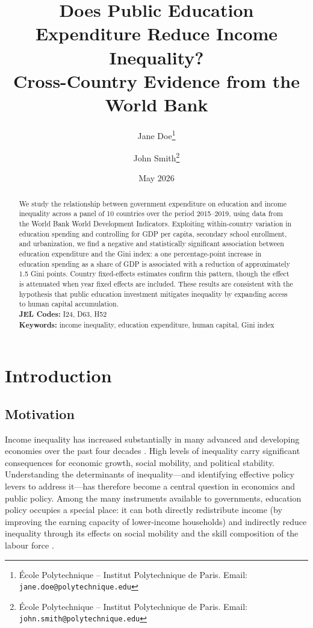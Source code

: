 \documentclass[12pt,a4paper]{article}
\title{\textbf{Does Public Education Expenditure Reduce Income Inequality?\\
Cross-Country Evidence from the World Bank}}
\author{
  Jane Doe\thanks{École Polytechnique -- Institut Polytechnique de Paris.
  Email: \texttt{jane.doe@polytechnique.edu}} \and
  John Smith\thanks{École Polytechnique -- Institut Polytechnique de Paris.
  Email: \texttt{john.smith@polytechnique.edu}}
}
\date{May 2026}
\begin{document}
\maketitle

\begin{abstract}
  \noindent
  We study the relationship between government expenditure on education and income
  inequality across a panel of 10 countries over the period 2015--2019, using data from
  the World Bank World Development Indicators. Exploiting within-country variation in
  education spending and controlling for GDP per capita, secondary school enrollment,
  and urbanization, we find a negative and statistically significant association between
  education expenditure and the Gini index: a one percentage-point increase in education
  spending as a share of GDP is associated with a reduction of approximately 1.5 Gini
  points. Country fixed-effects estimates confirm this pattern, though the effect is
  attenuated when year fixed effects are included. These results are consistent with
  the hypothesis that public education investment mitigates inequality by expanding
  access to human capital accumulation.\\[4pt]
  \textbf{JEL Codes:} I24, D63, H52\\
  \textbf{Keywords:} income inequality, education expenditure, human capital, Gini index
\end{abstract}

\newpage

\section{Introduction}
\label{sec:intro}

\subsection*{Motivation}

Income inequality has increased substantially in many advanced and developing economies
over the past four decades \citep{piketty2014capital, atkinson2015inequality}. High
levels of inequality carry significant consequences for economic growth, social mobility,
and political stability. Understanding the determinants of inequality---and identifying
effective policy levers to address it---has therefore become a central question in
economics and public policy. Among the many instruments available to governments,
education policy occupies a special place: it can both directly redistribute income
(by improving the earning capacity of lower-income households) and indirectly reduce
inequality through its effects on social mobility and the skill composition of the labour
force \citep{goldin2008race}.
\end{document}
